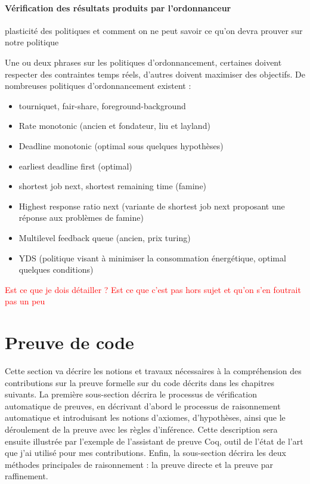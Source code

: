 		\paragraph{Vérification des résultats produits par l'ordonnanceur}
		plasticité des politiques et comment on ne peut savoir ce qu'on devra prouver sur notre politique

		Une ou deux phrases sur les politiques d'ordonnancement, certaines doivent respecter des contraintes temps réels, d'autres doivent maximiser des objectifs. 
		De nombreuses politiques d'ordonnancement existent :
		\begin{itemize}
			\item{tourniquet, fair-share, foreground-background }
			\item{Rate monotonic (ancien et fondateur, liu et layland)}
			\item{Deadline monotonic (optimal sous quelques hypothèses)}
			\item{earliest deadline first (optimal)}
			\item{shortest job next, shortest remaining time (famine)}
			\item{Highest response ratio next (variante de shortest job next proposant une réponse aux problèmes de famine)}
			\item{Multilevel feedback queue (ancien, prix turing)}
			\item{YDS (politique visant à minimiser la consommation énergétique, optimal quelques conditions)}
		\end{itemize}
		\textcolor{red}{Est ce que je dois détailler ? Est ce que c'est pas hors sujet et qu'on s'en foutrait pas un peu}

	\section{Preuve de code}

	Cette section va décrire les notions et travaux nécessaires à la compréhension des contributions sur la preuve formelle sur du code décrits dans les chapitres suivants. La première sous-section décrira le processus de vérification automatique de preuves, en décrivant d'abord le processus de raisonnement automatique et introduisant les notions d'axiomes, d'hypothèses, ainsi que le déroulement de la preuve avec les règles d'inférence. Cette description sera ensuite illustrée par l'exemple de l'assistant de preuve Coq, outil de l'état de l'art que j'ai utilisé pour mes contributions. Enfin, la sous-section décrira les deux méthodes principales de raisonnement : la preuve directe et la preuve par raffinement.

